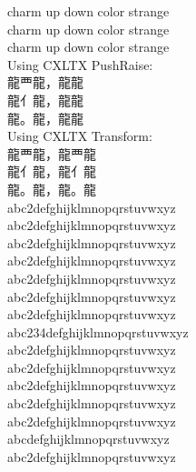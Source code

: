 \documentclass{article}
\newcommand{\cn}{\mktsFontfileSunexta\cjkgUseCjkGlue}
\begin{document}

%


charm up down color strange\\
charm {up} {down color} strange\\
charm up down color strange\\

Using CXLTX PushRaise:\\
{\cn 龍覀龍，龍龍}\\
{\cn 龍亻龍，龍龍}\\
{\cn 龍。龍，龍龍}\\

Using CXLTX Transform:\\
{\cn 龍覀龍，龍{覀}龍}\\
{\cn 龍亻龍，龍{亻}龍}\\
{\cn 龍。龍，龍{。}龍}\\


abc2defghijklmnopqrstuvwxyz\\
abc{2}defghijklmnopqrstuvwxyz\\
abc2defghijklmnopqrstuvwxyz\\

abc2defghijklmnopqrstuvwxyz\\
abc{2}defghijklmnopqrstuvwxyz\\
abc2defghijklmnopqrstuvwxyz\\

abc2defghijklmnopqrstuvwxyz\\
abc{234}defghijklmnopqrstuvwxyz\\
abc2defghijklmnopqrstuvwxyz\\

abc2defghijklmnopqrstuvwxyz\\
abc{2}defghijklmnopqrstuvwxyz\\
abc2defghijklmnopqrstuvwxyz\\

abc2defghijklmnopqrstuvwxyz\\
abc{defghij}klmnopqrstuvwxyz\\
abc2defghijklmnopqrstuvwxyz\\





%
\end{document}
